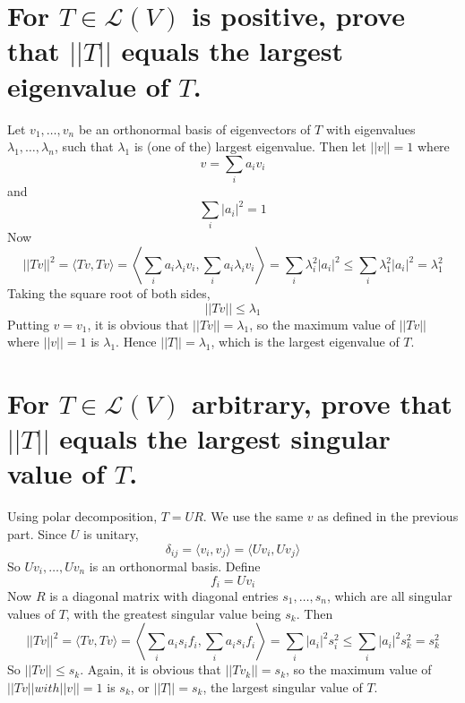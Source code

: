 \documentclass[answers]{exam}
\begin{document}
\begin{questions}

\begin{parts}
	\part{For $T \in \mathcal L(V)$ is positive, prove that $||T||$ equals the largest eigenvalue of $T$.}

	\begin{solution}
		Let $v_1,\dots,v_n$ be an orthonormal basis of eigenvectors of $T$ with eigenvalues $\lambda_1,\dots,\lambda_n$, such that $\lambda_1$ is (one of the) largest eigenvalue. Then let $||v|| = 1$ where
		$$v = \sum_i a_iv_i$$
		and
		$$\sum_i |a_i|^2 = 1$$
		Now
		$$||Tv||^2 = \langle Tv,Tv \rangle = \left\langle \sum_i a_i\lambda_iv_i,\sum_i a_i\lambda_iv_i \right\rangle = \sum_i \lambda_i^2|a_i|^2 \leq \sum_i \lambda_1^2|a_i|^2 = \lambda_1^2$$
		Taking the square root of both sides,
		$$||Tv|| \leq \lambda_1$$
		Putting $v=v_1$, it is obvious that $||Tv|| = \lambda_1$, so the maximum value of $||Tv||$ where $||v||=1$ is $\lambda_1$. Hence $||T|| = \lambda_1$, which is the largest eigenvalue of $T$.
	\end{solution}

	\part{For $T \in \mathcal L(V)$ arbitrary, prove that $||T||$ equals the largest singular value of $T$.}

	\begin{solution}
		Using polar decomposition, $T = UR$. We use the same $v$ as defined in the previous part. Since $U$ is unitary,
		$$\delta_{ij} = \langle v_i,v_j \rangle = \langle Uv_i,Uv_j \rangle$$
		So $Uv_i,\dots,Uv_n$ is an orthonormal basis. Define
		$$f_i = Uv_i$$
		Now $R$ is a diagonal matrix with diagonal entries $s_1,\dots,s_n$, which are all singular values of $T$, with the greatest singular value being $s_k$. Then
		$$||Tv||^2 = \langle Tv,Tv \rangle = \left\langle \sum_i a_is_if_i,\sum_i a_is_if_i \right\rangle = \sum_i |a_i|^2s_i^2 \leq \sum_i |a_i|^2s_k^2 = s_k^2$$
		So $||Tv|| \leq s_k$. Again, it is obvious that $||Tv_k|| = s_k$, so the maximum value of $||Tv|| with ||v||=1$ is $s_k$, or $||T|| = s_k$, the largest singular value of $T$.
	\end{solution}


\end{parts}
\end{questions}
\end{document}
